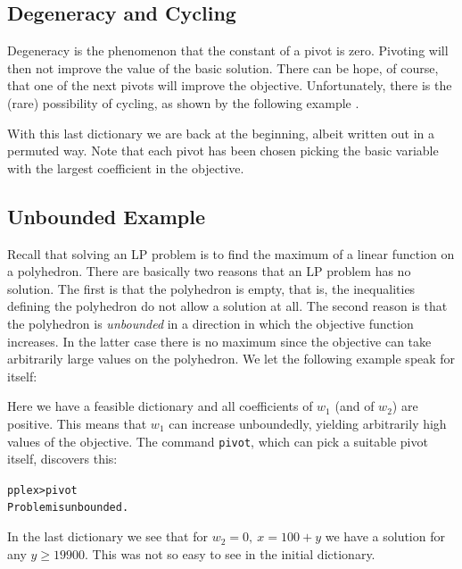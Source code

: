 \documentclass[ukenglish]{nik}
\begin{document}
\subsection{Degeneracy and Cycling}\label{sec:cycling}
Degeneracy is the phenomenon that the constant of a pivot
is zero. Pivoting will then not improve the value of the basic solution. 
There can be hope, of course, that one of the next pivots will improve
the objective. Unfortunately, there is the (rare) possibility of cycling,
as shown by the following example \cite{Chvatal,Vanderbei}.
\begin{alltt}

\end{alltt}
With this last dictionary we are back at the beginning, 
albeit written out in a permuted way. Note that each pivot has been
chosen picking the basic variable with the largest coefficient in the objective.


\subsection{Unbounded Example}\label{sec:unbounded}
Recall that solving an LP problem is to find the maximum of a linear
function on a polyhedron. There are basically two reasons that
an LP problem has no solution. The first is that the polyhedron is
empty, that is, the inequalities defining the polyhedron do not allow
a solution at all. The second reason is that the polyhedron is
\emph{unbounded} in a direction in which the objective function increases.
In the latter case there is no maximum since the objective can
take arbitrarily large values on the polyhedron. We let the following example
speak for itself:
\begin{alltt}

\end{alltt}
Here we have a feasible dictionary and all coefficients of $w_1$ 
(and of $w_2$) are positive. This means that $w_1$ can increase 
unboundedly, yielding arbitrarily high values of the objective.
The command \verb|pivot|, which can pick a suitable pivot itself,
discovers this:
\begin{alltt}
pplex> pivot
Problem is unbounded.
\end{alltt}
In the last dictionary we see that for $w_2 = 0,~x=100+y$ we have a solution
for any $y \geq 19900$. This was not so easy to see in the initial dictionary. 

\end{document}
